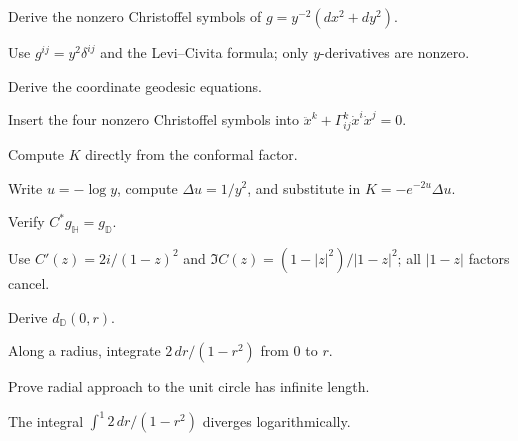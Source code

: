 \begin{problem}\label{prob:vii32-02}
Derive the nonzero Christoffel symbols of \(g=y^{-2}(dx^2+dy^2)\).
\end{problem}
\begin{solution}
Use \(g^{ij}=y^2\delta^{ij}\) and the Levi--Civita formula; only \(y\)-derivatives are nonzero.
\end{solution}

\begin{problem}\label{prob:vii32-03}
Derive the coordinate geodesic equations.
\end{problem}
\begin{solution}
Insert the four nonzero Christoffel symbols into \(\ddot x^k+\Gamma^k_{ij}\dot x^i\dot x^j=0\).
\end{solution}

\begin{problem}\label{prob:vii32-04}
Compute \(K\) directly from the conformal factor.
\end{problem}
\begin{solution}
Write \(u=-\log y\), compute \(\Delta u=1/y^2\), and substitute in \(K=-e^{-2u}\Delta u\).
\end{solution}

\begin{problem}\label{prob:vii32-05}
Verify \(C^*g_{\mathbb H}=g_{\mathbb D}\).
\end{problem}
\begin{solution}
Use \(C'(z)=2i/(1-z)^2\) and \(\Im C(z)=(1-|z|^2)/|1-z|^2\); all \(|1-z|\) factors cancel.
\end{solution}

\begin{problem}\label{prob:vii32-06}
Derive \(d_{\mathbb D}(0,r)\).
\end{problem}
\begin{solution}
Along a radius, integrate \(2\,dr/(1-r^2)\) from \(0\) to \(r\).
\end{solution}

\begin{problem}\label{prob:vii32-07}
Prove radial approach to the unit circle has infinite length.
\end{problem}
\begin{solution}
The integral \(\int^{1}2\,dr/(1-r^2)\) diverges logarithmically.
\end{solution}

